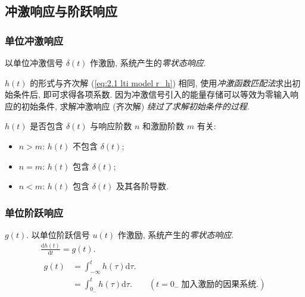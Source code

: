 \subsection{冲激响应与阶跃响应}

\subsubsection{单位冲激响应}

以单位冲激信号 $\delta(t)$ 作激励, 系统产生的\textit{零状态响应}.

$h(t)$ 的形式与齐次解 (\ref{eq:2.1 lti model r_h}) 相同, 使用\textit{冲激函数匹配法}求出初始条件后, 即可求得各项系数. 因为冲激信号引入的能量存储可以等效为零输入响应的初始条件, 求解冲激响应 (齐次解) \textit{绕过了求解初始条件的过程}.

$h(t)$ 是否包含 $\delta(t)$ 与响应阶数 $n$ 和激励阶数 $m$ 有关:
\begin{itemize}
    \item $n>m$: $h(t)$ 不包含 $\delta(t)$;
    \item $n=m$: $h(t)$ 包含 $\delta(t)$;
    \item $n<m$: $h(t)$ 包含 $\delta(t)$ 及其各阶导数.
\end{itemize}

\subsubsection{单位阶跃响应}

$g(t)$. 以单位阶跃信号 $u(t)$ 作激励, 系统产生的\textit{零状态响应}.
\begin{gather}
    \frac{\mathrm{d}h(t)}{\mathrm{d}t}=g(t). \\
    \begin{aligned}
        g(t) & =\int_{-\infty}^{t}h(\tau)\mathrm{d}\tau.                                \\
             & =\int_{0_-}^{t}h(\tau)\mathrm{d}\tau.\qquad (t=0_-\ \textrm{加入激励的因果系统}.)
    \end{aligned}
\end{gather}

